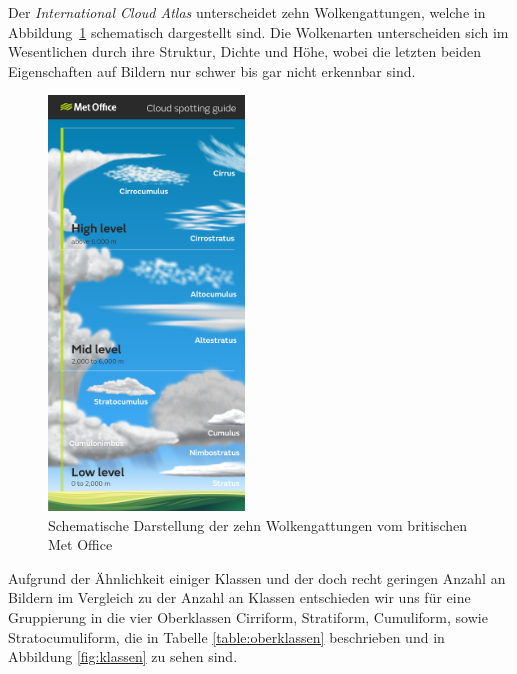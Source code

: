 \documentclass[a4,german]{article}
\begin{document}
Der \textit{International Cloud Atlas}\cite{internationalCloudAtlas} unterscheidet zehn Wolkengattungen, welche in Abbildung~\ref{fig:cloudtypes} schematisch dargestellt sind.
Die Wolkenarten unterscheiden sich im Wesentlichen durch ihre Struktur, Dichte und Höhe, wobei die letzten beiden Eigenschaften auf Bildern nur schwer bis gar nicht erkennbar sind.

\begin{figure}[h!]
\centering
\includegraphics[height=11cm,keepaspectratio]{Cloud_infographic-01.png}
\caption{Schematische Darstellung der zehn Wolkengattungen vom britischen Met Office\cite{metoffice}}
    \label{fig:cloudtypes}
\end{figure}

Aufgrund der Ähnlichkeit einiger Klassen und der doch recht geringen Anzahl an Bildern im Vergleich zu der Anzahl an Klassen entschieden wir uns für eine Gruppierung in die vier Oberklassen \glqq Cirriform\grqq, \glqq Stratiform\grqq, \glqq Cumuliform\grqq, sowie \glqq Stratocumuliform\grqq, die in Tabelle \ref{table:oberklassen} beschrieben und in Abbildung \ref{fig:klassen} zu sehen sind.
\end{document}
